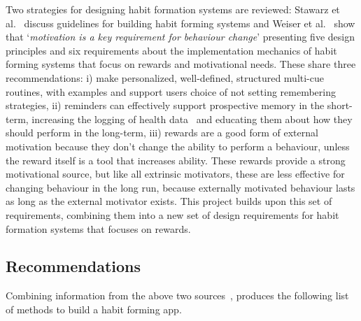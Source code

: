 Two strategies for designing habit formation systems are reviewed: Stawarz et al.~\cite{article_beyond_self_tracking_designing_apps} discuss guidelines for building habit forming systems and Weiser et al.~\cite{article_taxonomy_motivational_affordances_meaningful} show that `\textit{motivation is a key requirement for behaviour change}' presenting five design principles and six requirements about the implementation mechanics of habit forming systems that focus on rewards and motivational needs. These share three recommendations: i) make personalized, well-defined, structured multi-cue routines, with examples and support users choice of not setting remembering strategies, ii) reminders can effectively support prospective memory in the short-term, increasing the logging of health data~\cite{the_power_of_logging_mobile_notifications} and educating them about how they should perform in the long-term, iii) rewards are a good form of external motivation because they don't change the ability to perform a behaviour, unless the reward itself is a tool that increases ability. These rewards provide a strong motivational source, but like all extrinsic motivators, these are less effective for changing behaviour in the long run, because externally motivated behaviour lasts as long as the external motivator exists. This project builds upon this set of requirements, combining them into a new set of design requirements for habit formation systems that focuses on rewards.

\subsection{Recommendations} \label{recommendations}
Combining information from the above two sources~\cite{thesis_kathy, article_taxonomy_motivational_affordances_meaningful}, produces the following list of methods to build a habit forming app.\newline

